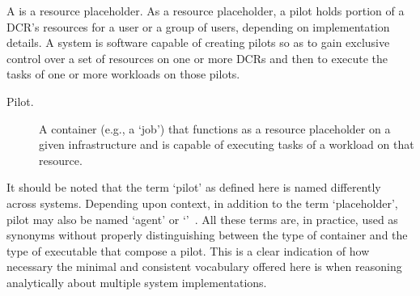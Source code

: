 \documentclass{sig-alternate}
\begin{document}


A \pilot is a resource placeholder. As a resource placeholder, a pilot holds
portion of a DCR's resources for a user or a group of users, depending on
implementation details. A \pilotjob system is software capable of creating
pilots so as to gain exclusive control over a set of resources on one or more
DCRs and then to execute the tasks of one or more workloads on those pilots.


\begin{description}

\item[Pilot.] A container (e.g., a `job') that functions as a resource
placeholder on a given infrastructure and is capable of executing tasks of a
workload on that resource.

\end{description}

It should be noted that the term `pilot' as defined here is named differently
across \pilotjob systems. Depending upon context, in addition to the term
`placeholder', pilot may also be named `agent' or
`\pilotjob'~\cite{moscicki2011,pinchak2002}. All these terms are, in practice,
used as synonyms without properly distinguishing between the type of container
and the type of executable that compose a pilot. This is a clear indication of
how necessary the minimal and consistent vocabulary offered here is when
reasoning analytically about multiple \pilotjob system implementations.
\end{document}
